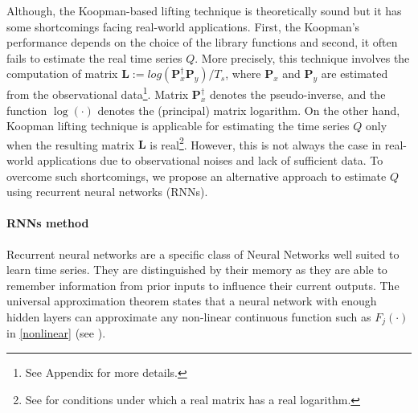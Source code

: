 Although, the Koopman-based lifting technique is theoretically sound but it has some shortcomings facing real-world applications.
First, the Koopman's performance depends on the choice of the library functions and second, it often fails to estimate the real time series $Q$.
More precisely, this technique involves the computation of matrix $\textbf{L}:=log(\textbf{P}_x^{\dagger}\textbf{P}_y)/T_s$, where $\textbf{P}_x$ and $\textbf{P}_y$ are estimated from the observational data\footnote{See Appendix for more details.}.
Matrix $\textbf{P}_x^{\dagger}$ denotes the pseudo-inverse, and the function $\log(\cdot)$ denotes the (principal) matrix logarithm.
On the other hand, Koopman lifting technique is applicable for estimating the time series $Q$ only when the resulting matrix $\textbf{L}$ is real\footnote{See \citet{culver1966existence} for conditions under which a real matrix has a real logarithm.}.
However, this is not always the case in real-world applications due to observational noises and lack of sufficient data. 
To overcome such shortcomings, we propose an alternative approach to estimate $Q$ using recurrent neural networks (RNNs).

\paragraph{RNNs method}
 Recurrent neural networks are a specific class of Neural Networks well suited to learn time series. 
 They are distinguished by their memory as they are able to remember information from prior inputs to influence their current outputs.
 The universal approximation theorem states that a neural network with enough hidden layers can approximate any non-linear continuous function such as $F_j(\cdot)$ in \eqref{nonlinear} (see \citet{HORNIK1989359}). 
 
